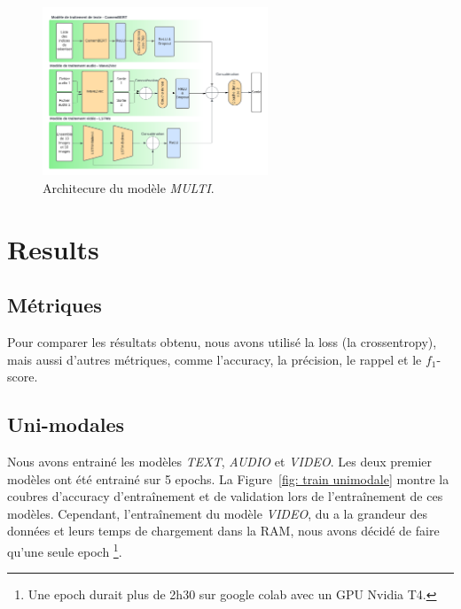 \documentclass[a4paper]{article}
\begin{document}
\begin{figure}[H]
    \centering
    \includegraphics[width=0.6\textwidth]{model_multi.png}
    \caption{Architecure du modèle \textit{MULTI}.}
    \label{fig: multi}
\end{figure}

\section{Results}

\subsection{Métriques}

Pour comparer les résultats obtenu, nous avons utilisé la loss (la crossentropy), mais aussi d'autres métriques,
comme l'accuracy, la précision, le rappel et le $f_1$-score.

\subsection{Uni-modales}

Nous avons entrainé les modèles \textit{TEXT}, \textit{AUDIO} et \textit{VIDEO}. Les deux premier modèles ont 
été entrainé sur 5 epochs. La Figure~\ref{fig: train unimodale} montre la coubres d'accuracy d'entraînement 
et de validation lors de l'entraînement de ces modèles.
Cependant, l'entraînement du modèle \textit{VIDEO}, du a la grandeur des données et 
leurs temps de chargement dans la RAM, nous avons décidé de faire qu'une seule epoch
\footnote{Une epoch durait plus de 2h30 sur google colab avec un GPU Nvidia T4.}.
\end{document}
